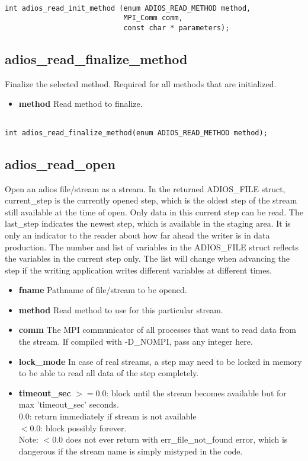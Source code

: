 \begin{lstlisting}[alsolanguage=C]

int adios_read_init_method (enum ADIOS_READ_METHOD method, 
                            MPI_Comm comm, 
                            const char * parameters);

\end{lstlisting}


\subsection{adios\_read\_finalize\_method}

Finalize the selected method. Required for all methods that are initialized. 
\begin{itemize}
\item{\bf method} Read method to finalize. 
\end{itemize}

\begin{lstlisting}[alsolanguage=C]

int adios_read_finalize_method(enum ADIOS_READ_METHOD method);
\end{lstlisting}


\subsection{adios\_read\_open}
Open an adios file/stream as a stream. In the returned ADIOS\_FILE struct, current\_step is the 
currently opened step, which is the oldest step of the stream still available at the time of open.
Only data in this current step can be read.
The last\_step indicates the newest step, which is available in the staging area. It is only an indicator
to the reader about how far ahead the writer is in data production.  
The number and list of variables in the ADIOS\_FILE struct reflects the variables in the current step only.
The list will change when advancing the step if the writing 
application writes different variables at different times. 

\begin{itemize}
\item{\bf fname}  Pathname of file/stream to be opened.
\item{\bf method}  Read method to use for this particular stream.
\item{\bf comm}    The MPI communicator of all processes that want to read data from the stream.
If compiled with -D\_NOMPI, pass any integer here.
\item{\bf lock\_mode} In case of real streams, a step may need to be locked in memory to be able
to read all data of the step completely.
\item{\bf timeout\_sec}  $>=0.0$: block until the stream becomes available but 
for max 'timeout\_sec' seconds.\\
$0.0$: return immediately if stream is not available\\
$<0.0$: block possibly forever.\\
Note: $<0.0$ does not ever return with err\_file\_not\_found error, 
which is dangerous if the stream name is simply mistyped in the code.
\end{itemize}

